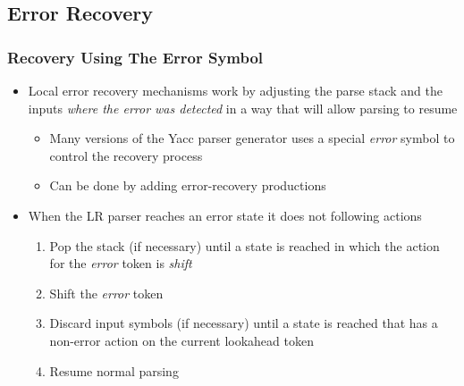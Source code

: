 \documentclass[11pt]{article}
\begin{document}
\subsection{Error Recovery}
\label{sec:org4d4181a}
\subsubsection{Recovery Using The Error Symbol}
\label{sec:orgbb18c25}
\begin{itemize}
\item Local error recovery mechanisms work by adjusting the parse stack and the inputs \emph{where the error was detected} in a way that will allow parsing to resume
\begin{itemize}
\item Many versions of the Yacc parser generator uses a special \emph{error} symbol to control the recovery process
\item Can be done by adding error-recovery productions
\end{itemize}

\item When the LR parser reaches an error state it does not following actions
\begin{enumerate}
\item Pop the stack (if necessary) until a state is reached in which the action for the \emph{error} token is \emph{shift}
\item Shift the \emph{error} token
\item Discard input symbols (if necessary) until a state is reached that has a non-error action on the current lookahead token
\item Resume normal parsing
\end{enumerate}
\end{itemize}
\end{document}
